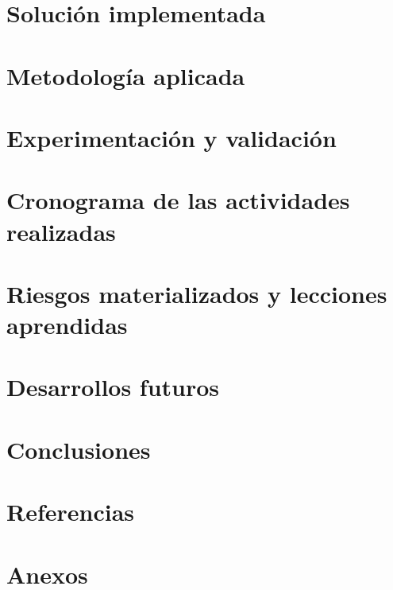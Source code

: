 \documentclass[11pt]{article}
\begin{document}
\section{Solución implementada}



\newpage

\section{Metodología aplicada}



\newpage

\section{Experimentación y validación}
\label{sec:validation}



\newpage

\section{Cronograma de las actividades realizadas}



\newpage

\section{Riesgos materializados y lecciones aprendidas}



\newpage

\section{Desarrollos futuros}



\newpage

\section{Conclusiones}



\newpage

\section{Referencias}



\newpage

\section{Anexos}


\end{document}

